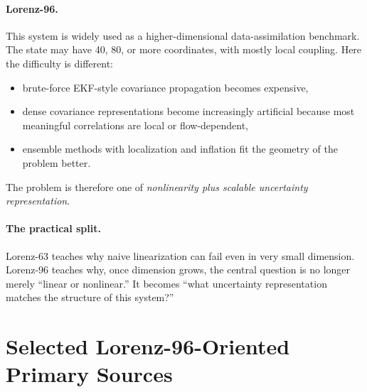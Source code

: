\documentclass[12pt,a4paper]{article}
\begin{document}
\paragraph{Lorenz-96.}
This system is widely used as a higher-dimensional data-assimilation benchmark. The state may have 40, 80, or more coordinates, with mostly local coupling. Here the difficulty is different:
\begin{itemize}
  \item brute-force EKF-style covariance propagation becomes expensive,
  \item dense covariance representations become increasingly artificial because most meaningful correlations are local or flow-dependent,
  \item ensemble methods with localization and inflation fit the geometry of the problem better.
\end{itemize}
The problem is therefore one of \emph{nonlinearity plus scalable uncertainty representation}.

\paragraph{The practical split.}
Lorenz-63 teaches why naive linearization can fail even in very small dimension. Lorenz-96 teaches why, once dimension grows, the central question is no longer merely ``linear or nonlinear.'' It becomes ``what uncertainty representation matches the structure of this system?''

\section{Selected Lorenz-96-Oriented Primary Sources}\label{app:lorenz-lit}
\end{document}
